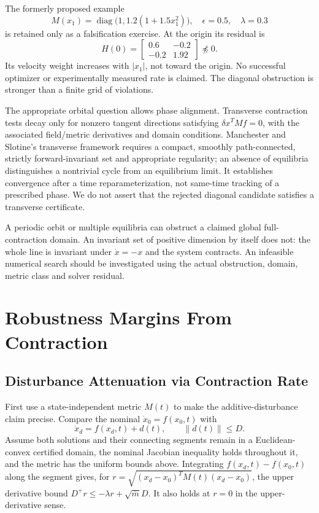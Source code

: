 The formerly proposed example
\begin{equation}
M(x_1)=\operatorname{diag}\bigl(1,1.2(1+1.5x_1^2)\bigr),\quad
\epsilon=0.5,\quad\lambda=0.3
\label{eq:ch4:vdp-metric-solution}
\end{equation}
is retained only as a falsification exercise. At the origin its residual is
\begin{equation}
H(0)=\begin{bmatrix}0.6&-0.2\\-0.2&1.92\end{bmatrix}\not\preceq0.
\label{eq:ch4:vdp-check}
\end{equation}
Its velocity weight increases with $|x_1|$, not toward the origin. No successful optimizer or experimentally measured rate is claimed. The diagonal obstruction is stronger than a finite grid of violations.

The appropriate orbital question allows phase alignment. Transverse contraction tests decay only for nonzero tangent directions satisfying $\delta x^TMf=0$, with the associated field/metric derivatives and domain conditions. Manchester and Slotine's transverse framework \cite{ManchesterSlotineTransverse2013} requires a compact, smoothly path-connected, strictly forward-invariant set and appropriate regularity; an absence of equilibria distinguishes a nontrivial cycle from an equilibrium limit. It establishes convergence after a time reparameterization, not same-time tracking of a prescribed phase. We do not assert that the rejected diagonal candidate satisfies a transverse certificate.

A periodic orbit or multiple equilibria can obstruct a claimed global full-contraction domain. An invariant set of positive dimension by itself does not: the whole line is invariant under $\dot x=-x$ and the system contracts. An infeasible numerical search should be investigated using the actual obstruction, domain, metric class and solver residual.

\section{Robustness Margins From Contraction}

\subsection{Disturbance Attenuation via Contraction Rate}

First use a state-independent metric $M(t)$ to make the additive-disturbance claim precise. Compare the nominal $\dot x_0=f(x_0,t)$ with
\begin{equation}
\dot x_d=f(x_d,t)+d(t),\qquad\|d(t)\|\leq D.
\label{eq:ch4:perturbed-system}
\end{equation}
Assume both solutions and their connecting segments remain in a Euclidean-convex certified domain, the nominal Jacobian inequality holds throughout it, and the metric has the uniform bounds above. Integrating $f(x_d,t)-f(x_0,t)$ along the segment gives, for $r=\sqrt{(x_d-x_0)^TM(t)(x_d-x_0)}$, the upper derivative bound $D^+r\leq-\lambda r+\sqrt{\overline m}D$. It also holds at $r=0$ in the upper-derivative sense.


